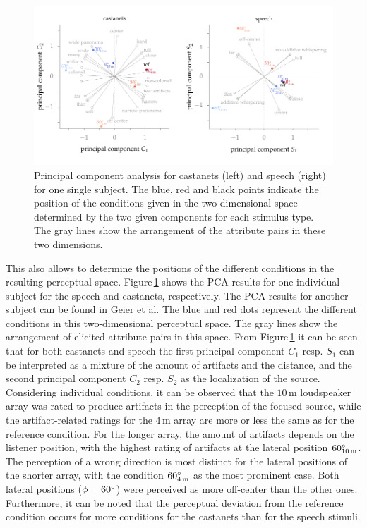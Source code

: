 \begin{figure}[t]
    \centering
    \includegraphics{fig5_14/fig5_14}
    \caption{Principal component analysis for castanets (left) and
    speech (right) for one single subject.
    The blue, red and black points indicate the position of the conditions given in the
    two-dimensional space determined by the two given components for each
    stimulus type. The gray lines show the arrangement of the attribute
    pairs in these two dimensions.
    }
    \label{fig:pca}
\end{figure}

This also allows to determine the positions of the different conditions in the
resulting perceptual space.  Figure\,\ref{fig:pca} shows the \ac{PCA} results
for one individual subject for the speech and castanets, respectively. The
\ac{PCA} results for another subject can be found in Geier et
al.\autocite{Geier2010a} The blue and red dots represent the different
conditions in this two-dimensional perceptual space. The gray lines show the
arrangement of elicited attribute pairs in this space.  From Figure\,\ref{fig:pca}
it can be seen that for both castanets and speech the first principal component
$C_1$ resp. $S_1$ can be interpreted as a mixture of the amount of artifacts and
the distance, and the second principal component $C_2$ resp. $S_2$ as the
localization of the source.  Considering individual conditions, it can be
observed that the $10$\,m loudspeaker array was rated to produce artifacts in
the perception of the focused source, while the artifact-related ratings for the
$4$\,m array are more or less the same as for the reference condition. For the
longer array, the amount of artifacts depends on the listener position, with the
highest rating of artifacts at the lateral position $60^\circ_{10\,\text{m}}$.
The perception of a wrong direction is most distinct for the
lateral positions of the shorter array, with the condition
$60^\circ_{4\,\text{m}}$ as the most prominent case.  Both lateral positions
($\phi = 60^\circ$) were perceived as more off-center than the other ones.
Furthermore, it can be noted that the perceptual deviation from the reference
condition occurs for more conditions for the castanets than for the speech
stimuli.


